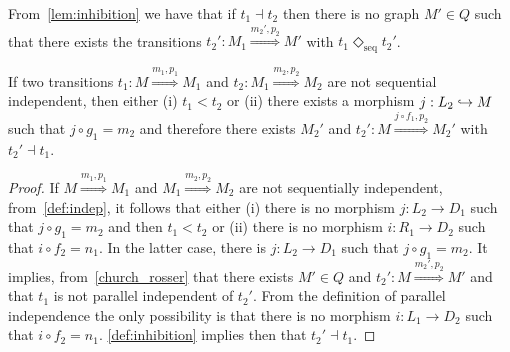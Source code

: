 From~\autoref{lem:inhibition} we have that if $t_1 \dashv t_2$ then there is no graph $M'\in Q$ such that there exists the transitions $t_2':M_1\overset{m_2',p_2}{\Rightarrow} M'$ with $t_1\Diamond_{\text{seq}}t_2'$.

\begin{lemma}
  \label{lem:not_seq_ind}
  If two transitions $t_1:M\overset{m_1,p_1}{\Rightarrow} M_1$ and $t_2: M_1\overset{m_2,p_2}{\Rightarrow} M_2$ are not sequential independent, then either (i) $t_1 < t_2$ or (ii) there exists a morphism $j:L_2 \hookrightarrow M$ such that $j\circ g_1 = m_2$ and therefore there exists $M_2'$ and $t_2':M\overset{j\circ f_1,p_2}{\Rightarrow} M_2'$ with $t_2'\dashv t_1$.
\end{lemma}
\begin{proof}
  If $M\overset{m_1,p_1}{\Rightarrow} M_1$ and $M_1\overset{m_2,p_2}{\Rightarrow} M_2$ are not sequentially independent, from~\autoref{def:indep}, it follows that either (i) there is no morphism $j:L_2\to D_1$ such that $j\circ g_1= m_2$ and then $t_1 < t_2$ or
(ii) there is no morphism $i:R_1\to D_2$ such that $i\circ f_2= n_1$. In the latter case, there is $j:L_2\to D_1$ such that $j\circ g_1= m_2$. It implies, from~\autoref{church_rosser} that there exists $M'\in Q$ and $t_2':M\overset{m_2',p_2}{\Rightarrow} M'$ and that $t_1$ is not parallel independent of $t_2'$. From the definition of parallel independence the only possibility is that there is no morphism $i:L_1\to D_2$ such that $i\circ f_2= n_1$. \autoref{def:inhibition} implies then that $t_2'\dashv t_1$.
\end{proof}


